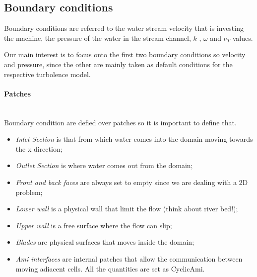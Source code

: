 \documentclass[a4paper,12pt]{article}
\begin{document}
\subsection{Boundary conditions}
Boundary conditions are referred to the water stream velocity that is investing the machine, the pressure of the water in the stream channel, $k$ , $\omega$ and $\nu_T$ values.

Our main interest is to focus onto the first two boundary conditions so velocity and pressure, since the other are mainly taken as default conditions for the respective turbolence model.

\paragraph{Patches}\mbox{}\\
Boundary condition are defied over patches so it is important to define that.
\begin{itemize}
\item \emph{Inlet Section} is that from which water comes into the domain moving towards the x direction;
\item \emph{Outlet Section} is where water comes out from the domain;
\item \emph{Front and back faces} are always set to empty since we are dealing with a 2D problem;
\item \emph{Lower wall} is a physical wall that limit the flow (think about river bed!);
\item \emph{Upper wall} is a free surface where the flow can slip;
\item \emph{Blades} are physical surfaces that moves inside the domain;
\item \emph{Ami interfaces} are internal patches that allow the communication between moving adiacent cells. All the quantities are set as CyclicAmi.
\end{itemize}
\end{document}
